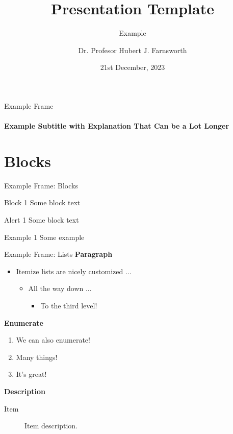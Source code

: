 \documentclass[aspectratio=43]{beamer}
\title{Presentation Template}
\subtitle{Example}
\author[H. J. F.]{Dr. Profesor Hubert J. Farnsworth}
\institute{West University of Timișoara}
\date{21st December, 2023}
\begin{document}
\titleframe

\begin{frame}{Example Frame}
\framesubtitle{Example Subtitle with Explanation That Can be a Lot Longer}
\end{frame}

\section{Blocks}

\begin{frame}{Example Frame: Blocks}
\begin{block}{Block 1}
Some block text
\end{block}

\begin{alertblock}{Alert 1}
Some block text
\end{alertblock}

\begin{exampleblock}{Example 1}
Some example
\end{exampleblock}
\end{frame}

\begin{frame}{Example Frame: Lists}
\small
\textbf{Paragraph}

\begin{itemize}
    \item Itemize lists are nicely customized ...
    \begin{itemize}
        \item All the way down ...
        \begin{itemize}
            \item To the third level!
        \end{itemize}
    \end{itemize}
\end{itemize}

\textbf{Enumerate}

\begin{enumerate}
    \item We can also enumerate!
    \item Many things!
    \item It's great!
\end{enumerate}
\end{frame}

\textbf{Description}
\begin{description}
    \item[Item] Item description.
\end{description}
\end{document}
